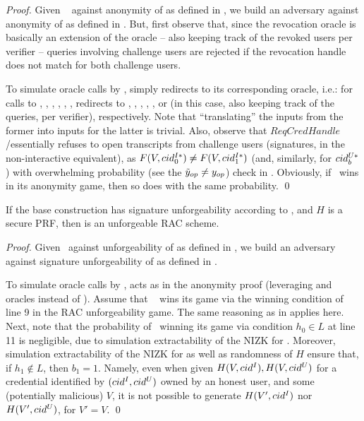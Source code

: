 \begin{proof}
  Given \adv~ against anonymity of \CUASRAC as defined in
  , we build an adversary \advB against anonymity of
  \CUASGen as defined in .
  But, first observe that, since the revocation oracle is basically an extension
  of the \OPEN oracle -- also keeping track of the revoked users per verifier --
  queries involving challenge users are rejected if the revocation handle does
  not match for both challenge users.
  
  To simulate oracle calls by \adv, \advB simply redirects to its corresponding
  oracle, i.e.: for calls to , , ,
  , , , \advB
  redirects to \HUGEN, \CUGEN, \OBTAIN, \SIGN, \CHALb, or \OPEN (in this case,
  also keeping track of the queries, per verifier), respectively.
  Note that ``translating'' the inputs from the former into inputs for the
  latter is trivial. Also, observe that $ReqCredHandle$/\OPEN essentially
  refuses to open transcripts from challenge users (signatures, in the
  non-interactive equivalent), as $F(V,cid^{I*}_0) \neq F(V,cid^{I*}_1)$ (and,
  similarly, for $cid^{U*}_b$) with overwhelming probability (see the $\tilde{y}_{op}
  \neq y_{op}$) check in . Obviously, if \adv~wins in its
  anonymity game, then so does \advB with the same probability.
  \qed
\end{proof}

\begin{theorem}
  If the base \CUASGen construction has signature unforgeability according to
  , and $H$ is a secure PRF, then \CUASRAC is an
  unforgeable RAC scheme.
\end{theorem}

\begin{proof}
  Given \adv~against unforgeability of \CUASRAC as defined in
  , we build an adversary \advB against signature
  unforgeability of \CUASGen as defined in .

  To simulate oracle calls by \adv, \advB acts as in the anonymity proof
  (leveraging \OBTISS and \ISSUE oracles instead of \OBTAIN). Assume that \adv~
  wins its game via the winning condition of line 9 in the RAC unforgeability
  game. The same reasoning as in \CUASAC applies here. Next, note that the
  probability of \adv~winning its game via condition $h_0 \in L$ at line 11 is
  negligible, due to simulation extractability of the NIZK for \RelSig.
  Moreover, simulation extractability of the NIZK for \RelSig as well as
  randomness of $H$ ensure that, if $h_1 \notin L$, then $b_1 = 1$. Namely, even
  when given $H(V,cid^I),H(V,cid^U)$ for a credential identified by
  $(cid^I,cid^U)$ owned by an honest user, and some (potentially malicious) $V$,
  it is not possible to generate $H(V',cid^I)$ nor $H(V',cid^U)$, for $V'=V$.
  \qed
\end{proof}

